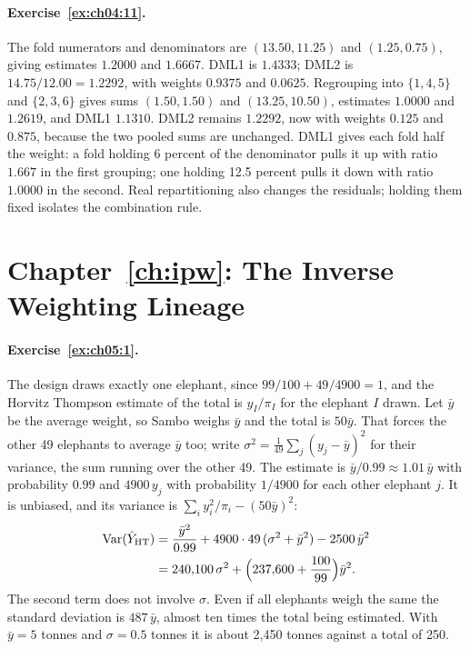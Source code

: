 \paragraph{Exercise~\ref{ex:ch04:11}.} The fold numerators and denominators are $(13.50,11.25)$ and $(1.25,0.75)$, giving estimates $1.2000$ and $1.6667$. DML1 is $1.4333$; DML2 is $14.75/12.00=1.2292$, with weights $0.9375$ and $0.0625$. Regrouping into $\{1,4,5\}$ and $\{2,3,6\}$ gives sums $(1.50,1.50)$ and $(13.25,10.50)$, estimates $1.0000$ and $1.2619$, and DML1 $1.1310$. DML2 remains $1.2292$, now with weights $0.125$ and $0.875$, because the two pooled sums are unchanged. DML1 gives each fold half the weight: a fold holding 6 percent of the denominator pulls it up with ratio $1.667$ in the first grouping; one holding 12.5 percent pulls it down with ratio $1.0000$ in the second. Real repartitioning also changes the residuals; holding them fixed isolates the combination rule.

\section*{Chapter~\ref{ch:ipw}: The Inverse Weighting Lineage}

\paragraph{Exercise~\ref{ex:ch05:1}.} The design draws exactly one elephant, since $99/100 + 49/4900 = 1$, and the Horvitz Thompson estimate of the total is $y_I/\pi_I$ for the elephant $I$ drawn. Let $\bar y$ be the average weight, so Sambo weighs $\bar y$ and the total is $50\bar y$. That forces the other 49 elephants to average $\bar y$ too; write $\sigma^2 = \frac{1}{49}\sum_j (y_j - \bar y)^2$ for their variance, the sum running over the other 49. The estimate is $\bar y/0.99 \approx 1.01\,\bar y$ with probability $0.99$ and $4900\,y_j$ with probability $1/4900$ for each other elephant $j$. It is unbiased, and its variance is $\sum_i y_i^2/\pi_i - (50\bar y)^2$:
\[
\begin{aligned}
\mathrm{Var}(\hat Y_{\mathrm{HT}}) &= \frac{\bar y^2}{0.99} + 4900 \cdot 49\,(\sigma^2 + \bar y^2) - 2500\,\bar y^2 \\
&= 240{,}100\,\sigma^2 + \Bigl(237{,}600 + \frac{100}{99}\Bigr)\bar y^2.
\end{aligned}
\]
The second term does not involve $\sigma$. Even if all elephants weigh the same the standard deviation is $487\,\bar y$, almost ten times the total being estimated. With $\bar y = 5$ tonnes and $\sigma = 0.5$ tonnes it is about 2,450 tonnes against a total of 250.

